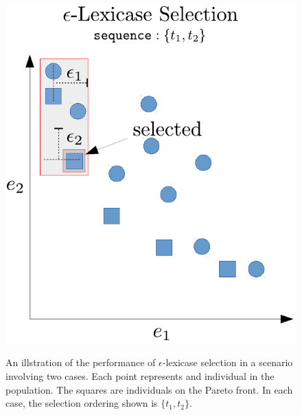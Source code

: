 \documentclass[preprint]{article}
\begin{document}
\begin{figure}
\begin{minipage}{0.49\textwidth}
  \includegraphics[width = \textwidth]{figs/ep-lex_pareto.pdf}\label{fig:ep-lex_pareto}
  \caption{An illstration of the performance of $\epsilon$-lexicase selection in a scenario involving two cases. Each point represents and individual in the population. The squares are individuals on the Pareto front. In each case, the selection ordering shown is $\{t_1,t_2\}$. }
\end{minipage}
\end{figure}
\end{document}
